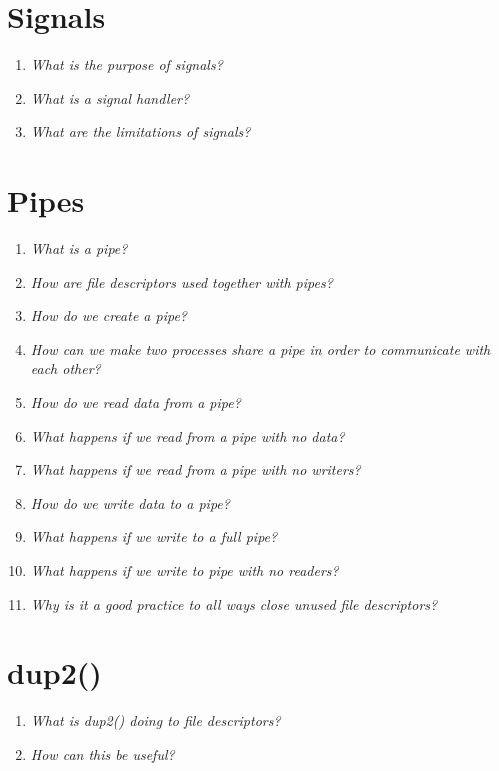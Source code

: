 \documentclass[a4paper]{article}
\begin{document}
\section{Signals}
\begin{enumerate}
  \item \textit{What is the purpose of signals?} \\
    
  \item \textit{What is a signal handler?} \\
    
  \item \textit{What are the limitations of signals?} \\
\end{enumerate}

\section{Pipes}
\begin{enumerate}
  \item \textit{What is a pipe?}
  \item \textit{How are file descriptors used together with pipes?}
  \item \textit{How do we create a pipe?}
  \item \textit{How can we make two processes share a pipe in order to communicate with each other?}
  \item \textit{How do we read data from a pipe?}
  \item \textit{What happens if we read from a pipe with no data?}
  \item \textit{What happens if we read from a pipe with no writers?}
  \item \textit{How do we write data to a pipe?}
  \item \textit{What happens if we write to a full pipe?}
  \item \textit{What happens if we write to pipe with no readers?}
  \item \textit{Why is it a good practice to all ways close unused file descriptors?}
\end{enumerate}

\section{dup2()}
\begin{enumerate}
  \item \textit{What is dup2() doing to file descriptors?}
  \item \textit{How can this be useful?}
\end{enumerate}
\end{document}
